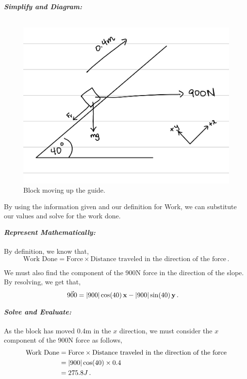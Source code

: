 \begin{subquestions}
\begin{subsubquestions}
	
\textbf{\textit{Simplify and Diagram:}} \\ \\
\begin{figure}[H]
	\begin{center}
		\includegraphics[scale=0.25]{../2011/figures/2011q6-1}
		\caption{\label{2011:q6:Diagram2} Block moving up the guide.}
	\end{center}
\end{figure}
By using the information given and our definition for Work, we can substitute our values and solve for the work done.




\textbf{\textit{Represent Mathematically:}} \\ \\
By definition, we know that,
\begin{equation}
	\text{Work Done} = \text{Force} \times \text{Distance traveled in the direction of the force} \,.
\end{equation}

We must also find the component of the 900N force in the direction of the slope. By resolving, we get that,
\begin{align}
	\vec{900} & = |900|\cos(40) \,\mathbf{x} -|900|\sin(40) \,\mathbf{y} \,.
\end{align}




\textbf{\textit{Solve and Evaluate:}} \\ \\
As the block has moved 0.4m in the $x$ direction, we must consider the $x$ component of the 900N force as follows,
\begin{align}
	\text{Work Done} & = \text{Force} \times \text{Distance traveled in the direction of the force} \nonumber \\
	                 & = |900|\cos(40) \times 0.4 \nonumber \\
	                 & = 275.8 J \,.
\end{align}


\end{subsubquestions}
\end{subquestions}
